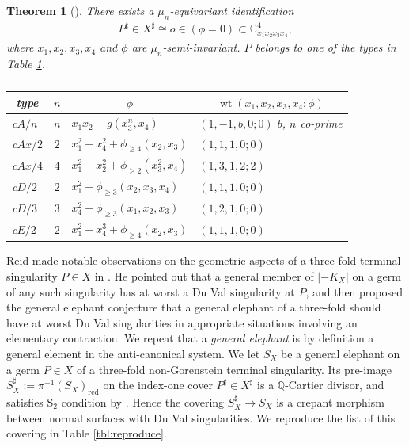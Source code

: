 \documentclass[a4paper,11pt]{amsart}
\newtheorem{theorem}{Theorem}[section]
\theoremstyle{definition}
\theoremstyle{remark}
\numberwithin{equation}{section}
\newcommand{\bC}{{\mathbb C}}
\newcommand{\bQ}{{\mathbb Q}}
\newcommand{\red}{\mathrm{red}}
\newcommand{\wt}{\operatorname{wt}}
\newcommand{\system}[1]{\left|{#1}\right|}
\begin{document}
\begin{theorem}[{\cite{Mo85}}]\label{thm:Mo85}
There exists a $\mu_n$-equivariant identification
\begin{align*}
P^\sharp \in X^\sharp \cong o \in (\phi=0) \subset \bC^4_{x_1x_2x_3x_4},
\end{align*}
where $x_1, x_2, x_3, x_4$ and $\phi$ are $\mu_n$-semi-invariant.
$P$ belongs to one of the types in Table \textup{\ref{tbl:Mo85}}.

\begin{table}[ht]
\caption{}\label{tbl:Mo85}
\begin{tabular}{l|c|l|l}
\hline
\multicolumn{1}{c|}{\textup{type}} & $n$ & \multicolumn{1}{c|}{$\phi$} &
\multicolumn{1}{c}{$\wt(x_1,x_2,x_3,x_4; \phi)$} \\
\hline
\textup{c$A/n$}  & $n$ &
$x_1x_2+g(x_3^n,x_4)$ & $(1,-1,b,0;0)$ \textup{$b$, $n$ co-prime} \\
\textup{c$Ax/2$} & $2$ &
$x_1^2+x_4^2+\phi_{\ge 4}(x_2,x_3)$   & $(1,1,1,0;0)$ \\
\textup{c$Ax/4$} & $4$ &
$x_1^2+x_2^2+\phi_{\ge 2}(x_3^2,x_4)$ & $(1,3,1,2;2)$ \\
\textup{c$D/2$}  & $2$ &
$x_1^2+\phi_{\ge 3}(x_2,x_3,x_4)$     & $(1,1,1,0;0)$ \\
\textup{c$D/3$}  & $3$ &
$x_4^2+\phi_{\ge 3}(x_1,x_2,x_3)$     & $(1,2,1,0;0)$ \\
\textup{c$E/2$}  & $2$ &
$x_1^2+x_4^3+ \phi_{\ge 4}(x_2,x_3)$  & $(1,1,1,0;0)$ \\
\hline
\end{tabular}
\end{table}
\end{theorem}

Reid made notable observations on
the geometric aspects of a three-fold terminal singularity $P \in X$
in \cite{Re87}.
He pointed out that a general member of $\system{-K_X}$
on a germ of any such singularity has at worst a Du Val singularity at $P$,
and then proposed the general elephant conjecture
that a general elephant of a three-fold
should have at worst Du Val singularities
in appropriate situations involving an elementary contraction.
We repeat that a \textit{general elephant} is by definition
a general element in the anti-canonical system.
We let $S_X$ be a general elephant on a germ $P \in X$ of
a three-fold non-Gorenstein terminal singularity.
Its pre-image $S_X^\sharp:=\pi^{-1}(S_X)_\red$
on the index-one cover $P^\sharp \in X^\sharp$ is a $\bQ$-Cartier divisor,
and satisfies $\mathrm{S}_2$ condition by \cite[Corollary 5.25]{KM98}.
Hence the covering $S_X^\sharp \to S_X$ is a crepant morphism
between normal surfaces with Du Val singularities.
We reproduce the list of this covering in Table \ref{tbl:reproduce}.
\end{document}
